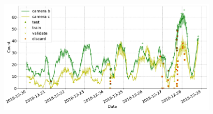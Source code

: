 \begin{figure}
    \centering
    \includegraphics[width=1.0\linewidth]{charts/seals/scott_base.pdf}
    \caption{}
    \label{fig:seals_timeseries}
\end{figure}
